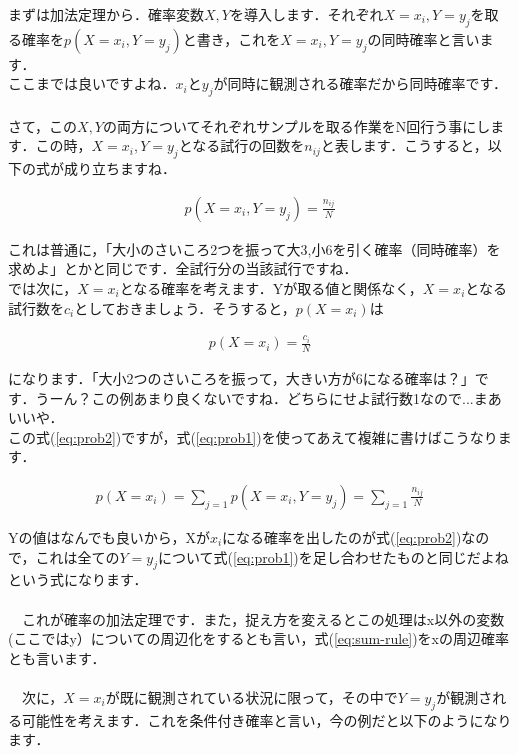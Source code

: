 \documentclass[11pt,a4paper,uplatex]{ujreport} 	%
\begin{document}
まずは加法定理から．確率変数$X,Y$を導入します．それぞれ$X=x_i, Y=y_j$を取る確率を$p(X=x_i, Y=y_j)$と書き，これを$X=x_i, Y=y_j$の同時確率と言います．\\

ここまでは良いですよね．$x_iとy_j$が同時に観測される確率だから同時確率です．\\
\\

さて，この$X, Y$の両方についてそれぞれサンプルを取る作業をN回行う事にします．この時，$X=x_i, Y=y_j$となる試行の回数を$n_{ij}$と表します．こうすると，以下の式が成り立ちますね．

\begin{align}
\label{eq:prob1}
p(X=x_i, Y=y_j) = \frac{n_{ij}}{N}
\end{align}

これは普通に，「大小のさいころ2つを振って大3,小6を引く確率（同時確率）を求めよ」とかと同じです．全試行分の当該試行ですね．
\\

では次に，$X=x_i$となる確率を考えます．Yが取る値と関係なく，$X=x_i$となる試行数を$c_i$としておきましょう．そうすると，$p(X=x_i)$は

\begin{align}
\label{eq:prob2}
p(X=x_i) = \frac{c_i}{N}
\end{align}

になります．「大小2つのさいころを振って，大きい方が6になる確率は？」です．うーん？この例あまり良くないですね．どちらにせよ試行数1なので...まあいいや．\\

この式(\ref{eq:prob2})ですが，式(\ref{eq:prob1})を使ってあえて複雑に書けばこうなります．

\begin{align}
\label{eq:sum-rule}
p(X=x_i) = \sum_{j=1} p(X=x_i, Y=y_j) = \sum_{j=1} \frac{n_{ij}}{N}
\end{align}

Yの値はなんでも良いから，Xが$x_i$になる確率を出したのが式(\ref{eq:prob2})なので，これは全ての$Y=y_j$について式(\ref{eq:prob1})を足し合わせたものと同じだよねという式になります．\\
\\
　これが確率の加法定理です．また，捉え方を変えるとこの処理はx以外の変数(ここではy）についての周辺化をするとも言い，式(\ref{eq:sum-rule})をxの周辺確率とも言います．\\
\\
　次に，$X=x_i$が既に観測されている状況に限って，その中で$Y=y_j$が観測される可能性を考えます．これを条件付き確率と言い，今の例だと以下のようになります．
\end{document}
